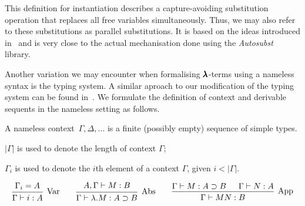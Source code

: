 This definition for instantiation describes a capture-avoiding substitution operation that replaces all free variables simultaneously.
Thus, we may also refer to these substitutions as parallel substitutions.
It is based on the ideas introduced in~\cite{AutosubstSchafer} and is very close to the actual mechanisation done using the \textit{Autosubst} library.

Another variation we may encounter when formalising $\pmb{\lambda}$-terms using a nameless syntax is the typing system.
A similar aproach to our modification of the typing system can be found in~\cite[Chapter~7]{AndrewAdams}.
We formulate the definition of context and derivable sequents in the nameless setting as follows.

\begin{definition}
  A nameless context~$\Gamma, \Delta, \dots$ is a finite (possibly empty) sequence of simple types.
\end{definition}

\begin{notation} \hfill
  
  $| \Gamma |$ is used to denote the length of context $\Gamma$;

  $\Gamma_i$ is used to denote the $i$th element of a context $\Gamma$, given $i < | \Gamma |$.
\end{notation}

\begin{definition}
  \label{nameless_typing_rules}
  \[
    \begin{prooftree}
      \hypo{ \Gamma_i = A }
      \infer1[Var]{ \Gamma \vdash i:A } 
    \end{prooftree}
    \qquad
    \begin{prooftree}
      \hypo{ A, \Gamma \vdash M:B }
      \infer1[Abs]{ \Gamma \vdash \lambda . M : A \supset B  } 
    \end{prooftree}
    \qquad
    \begin{prooftree}
      \hypo{ \Gamma \vdash M : A \supset B }
      \hypo{ \Gamma \vdash N : A }	
      \infer2[App]{ \Gamma \vdash M N : B } 
    \end{prooftree}
  \]
\end{definition}

\begin{comment}
\begin{remark}
  \label{nameless_typing_remark}
  For such strict definitions of contexts and typing rules we would require admissibility for structural rules (like the weakening rule shown below).
  \[
    \begin{prooftree}
      \hypo{ \Gamma \vdash M:A }
      \infer1[Weakening]{ B, \Gamma \vdash M[\uparrow]:A } 
    \end{prooftree}
  \]
  That way, we show that our contexts as sequences may behave as multisets (as expected).
\end{remark}
\end{comment}

